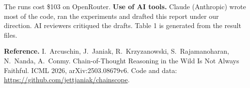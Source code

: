 \documentclass[10pt]{article}
\begin{document}
The runs cost \$103 on OpenRouter. \textbf{Use of AI tools.} Claude (Anthropic) wrote most of the code, ran the experiments and drafted this report under our direction. AI reviewers critiqued the drafts. Table 1 is generated from the result files.

\vspace{0.2em}
\small\textbf{Reference.} I.~Arcuschin, J.~Janiak, R.~Krzyzanowski, S.~Rajamanoharan, N.~Nanda, A.~Conmy. Chain-of-Thought Reasoning in the Wild Is Not Always Faithful. ICML 2026, arXiv:2503.08679v6. Code and data: \url{https://github.com/jettjaniak/chainscope}.
\end{document}
